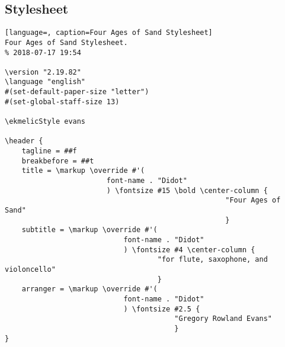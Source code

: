\subsection{Stylesheet}
\begin{lstlisting}[language=, caption=Four Ages of Sand Stylesheet]
Four Ages of Sand Stylesheet.
% 2018-07-17 19:54

\version "2.19.82"
\language "english"
#(set-default-paper-size "letter")
#(set-global-staff-size 13)

\ekmelicStyle evans

\header {
	tagline = ##f
	breakbefore = ##t
	title = \markup \override #'(
						font-name . "Didot"
						) \fontsize #15 \bold \center-column {
													"Four Ages of Sand"
													}
	subtitle = \markup \override #'(
							font-name . "Didot"
							) \fontsize #4 \center-column {
									"for flute, saxophone, and violoncello"
									}
	arranger = \markup \override #'(
							font-name . "Didot"
							) \fontsize #2.5 {
										"Gregory Rowland Evans"
										}
}


\end{lstlisting}

